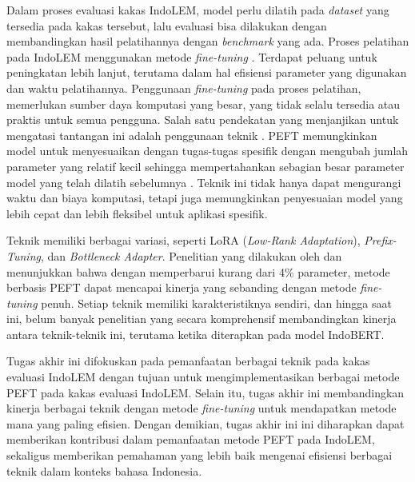 Dalam proses evaluasi kakas IndoLEM, model perlu dilatih pada \textit{dataset} yang tersedia pada kakas tersebut, lalu evaluasi bisa dilakukan dengan membandingkan hasil pelatihannya dengan \textit{benchmark} yang ada. Proses pelatihan pada IndoLEM menggunakan metode \textit{fine-tuning} \parencite{indolem}. Terdapat peluang untuk peningkatan lebih lanjut, terutama dalam hal efisiensi parameter yang digunakan dan waktu pelatihannya. Penggunaan \textit{fine-tuning} pada proses pelatihan, memerlukan sumber daya komputasi yang besar, yang tidak selalu tersedia atau praktis untuk semua pengguna. Salah satu pendekatan yang menjanjikan untuk mengatasi tantangan ini adalah penggunaan teknik \PEFT. PEFT memungkinkan model untuk menyesuaikan dengan tugas-tugas spesifik dengan mengubah jumlah parameter yang relatif kecil sehingga mempertahankan sebagian besar parameter model yang telah dilatih sebelumnya \parencite{adapter_houlsby}. Teknik ini tidak hanya dapat mengurangi waktu dan biaya komputasi, tetapi juga memungkinkan penyesuaian model yang lebih cepat dan lebih fleksibel untuk aplikasi spesifik. 

Teknik \PEFT memiliki berbagai variasi, seperti LoRA (\textit{Low-Rank Adaptation}), \textit{Prefix-Tuning}, dan \textit{Bottleneck Adapter}. Penelitian yang dilakukan oleh \citeauthor{adapter_houlsby} \parencite{adapter_houlsby} dan \citeauthor{uvpl} \parencite{uvpl} menunjukkan bahwa dengan memperbarui kurang dari 4\% parameter, metode berbasis PEFT dapat mencapai kinerja yang sebanding dengan metode \textit{fine-tuning} penuh. Setiap teknik memiliki karakteristiknya sendiri, dan hingga saat ini, belum banyak penelitian yang secara komprehensif membandingkan kinerja antara teknik-teknik ini, terutama ketika diterapkan pada model IndoBERT. 

Tugas akhir ini  difokuskan pada pemanfaatan berbagai teknik \PEFT pada kakas evaluasi IndoLEM dengan tujuan untuk mengimplementasikan berbagai metode PEFT pada kakas evaluasi IndoLEM. Selain itu, tugas akhir ini  membandingkan kinerja berbagai teknik \PEFT dengan metode \textit{fine-tuning}  untuk mendapatkan metode mana yang paling efisien. Dengan demikian, tugas akhir ini ini diharapkan dapat memberikan kontribusi dalam pemanfaatan metode PEFT pada IndoLEM, sekaligus memberikan pemahaman yang lebih baik mengenai efisiensi berbagai teknik \PEFT dalam konteks bahasa Indonesia.
